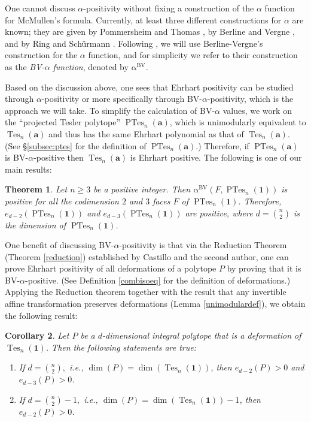 \documentclass[12pt]{amsart}
\numberwithin{equation}{section}
\newtheorem{thm}{Theorem}[section]
\newtheorem{cor}[thm]{Corollary}
\theoremstyle{definition}
\def\tes{\operatorname{Tes}}
\def\ptes{\operatorname{PTes}}
\def\1{{\boldsymbol{1}}}
\def\ba{{\boldsymbol{a}}}
\def\bvalpha{\operatorname{\alpha^{BV}}}
\begin{document}
One cannot discuss $\alpha$-positivity without fixing a construction of the $\alpha$ function for McMullen's formula.
Currently, at least three different constructions for $\alpha$ are known; they are given by Pommersheim and Thomas \cite{pommersheim2004cycles}, by Berline and Vergne \cite{berline2007local}, and by Ring and Sch{\"u}rmann \cite{ring2017local}. Following \cite{castillo2018berline}, we will use Berline-Vergne's construction for the $\alpha$ function, and for simplicity we refer to their construction as the \emph{BV-$\alpha$ function}, denoted by $\bvalpha$.

Based on the discussion above, one sees that Ehrhart positivity can be studied through $\alpha$-positivity or more specifically through BV-$\alpha$-positivity, which is the approach we will take. To simplify the calculation of BV-$\alpha$ values, we work on the ``projected Tesler polytope'' $\ptes_{n}(\ba)$, which is unimodularly equivalent to $\tes_{n}(\ba)$ and thus has the same Ehrhart polynomial as that of $\tes_n(\ba).$ (See \S \ref{subsec:ptes} for the definition of $\ptes_{n}(\ba)$.) Therefore, if $\ptes_{n}(\ba)$ is BV-$\alpha$-positive then $\tes_{n}(\ba)$ is Ehrhart positive. The following is one of our main results: 

\begin{thm} \label{ptes-positive}
  Let $n \ge 3$ be a positive integer. Then $\bvalpha(F, \ptes_n(\1))$ is positive for all the codimension $2$ and $3$ faces $F$ of $\ptes_{n}(\boldsymbol{1})$. Therefore, $e_{d-2}(\ptes_{n}(\boldsymbol{1}))$ and $e_{d-3}(\ptes_{n}(\boldsymbol{1}))$ are positive, where $d=\binom{n}{2}$ is the dimension of $\ptes_{n}(\boldsymbol{1})$.
\end{thm}

One benefit of discussing BV-$\alpha$-positivity is that via the Reduction Theorem (Theorem \ref{reduction}) established by Castillo and the second author, one can prove Ehrhart positivity of all deformations of a polytope $P$ by proving that it is BV-$\alpha$-positive. (See Definition \ref{combisoeq} for the definition of deformations.) 
Applying the Reduction theorem together with the result that any invertible affine transformation preserves deformations (Lemma \ref{unimodulardef}), we obtain the following result:

\begin{cor} \label{teslerdef-positiv} 
Let $P$ be a $d$-dimensional integral polytope that is a deformation of $\tes_{n}(\boldsymbol{1})$. Then the following statements are true:
\begin{enumerate}[label={\rm (\arabic*)}]
  \item If $d = \binom{n}{2},$ i.e., $\dim(P)=\dim(\tes_{n}(\boldsymbol{1}))$, then $e_{d-2}(P)>0$ and $e_{d-3}(P)>0$. 
  \item If $d = \binom{n}{2}-1,$ i.e., $\dim(P)=\dim(\tes_{n}(\boldsymbol{1}))-1$, then $e_{d-2}(P)>0$.
\end{enumerate}
\end{cor}
\end{document}
